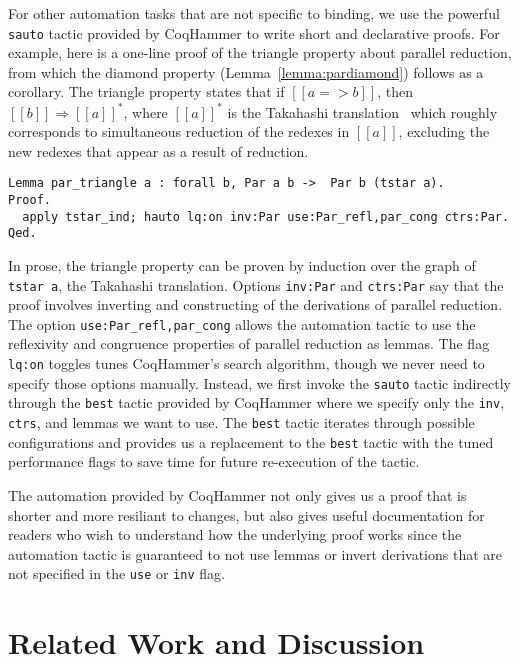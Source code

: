 \documentclass[acmsmall,screen=true,
\ifpublic review=false\else,review=true\fi
  ,anonymous=\ifanonymous true\else false\fi]{acmart}
\newcommand{\scw}[1]{}
\begin{document}
For other automation tasks that are not specific to binding, we use
the powerful \texttt{sauto} tactic provided by CoqHammer to write
short and declarative proofs. For example, here is a one-line proof of
the triangle property about parallel reduction, from which the diamond
property (Lemma~\ref{lemma:pardiamond}) follows as a corollary.
The triangle property states
that if $[[a => b]]$, then $[[b]]\Rightarrow [[a]]^*$, where $[[a]]^*$
is the Takahashi translation~\citep{takahashi-parallel-reduction}
which roughly corresponds to simultaneous reduction of the redexes in
$[[a]]$, excluding the new redexes that appear as a result of
reduction.
\begin{verbatim}
Lemma par_triangle a : forall b, Par a b ->  Par b (tstar a).
Proof.
  apply tstar_ind; hauto lq:on inv:Par use:Par_refl,par_cong ctrs:Par.
Qed.
\end{verbatim}
In prose, the triangle property can be proven by induction over the
graph of \texttt{tstar a}, the Takahashi translation. Options \texttt{inv:Par} and
\texttt{ctrs:Par} say that the proof involves inverting and
constructing of the derivations of parallel
reduction. The option \texttt{use:Par\_refl,par\_cong} allows the
automation tactic to use
the reflexivity and congruence properties of parallel
reduction as lemmas.
The flag \texttt{lq:on} toggles tunes CoqHammer's search
algorithm, though we never need to specify those options
manually. Instead, we first invoke the \texttt{sauto} tactic indirectly through the
\texttt{best} tactic provided by CoqHammer where we specify only the
\texttt{inv}, \texttt{ctrs}, and lemmas we want to use. The
\texttt{best} tactic iterates through possible configurations and
provides us a replacement to the \texttt{best} tactic with the
tuned performance flags to save time for future re-execution of the
tactic.

The automation provided by CoqHammer not only gives us a proof that is
shorter and more resiliant to changes, but also gives useful
documentation for readers who wish to understand how the underlying
proof works since the automation tactic is guaranteed to not use
lemmas or invert derivations that are not specified in the
\texttt{use} or \texttt{inv} flag.


\section{Related Work and Discussion}
\label{sec:relatedwork}

\scw{Maybe it would be useful to include a chart here, so that readers can
  easily keep track of the features of the various languages.  i.e. which ones
  include large eliminations? type-directed equivalence? impredicative prop?
  inductive datatypes? what are their line counts?}
\end{document}
